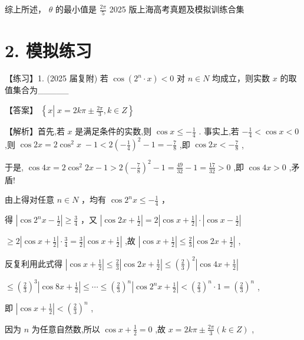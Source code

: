 \documentclass[10pt]{article}
\begin{document}
综上所述， \(\theta\) 的最小值是 \(\frac{2\pi }{5}\) 2025 版上海高考真题及模拟训练合集

\section*{2. 模拟练习}

【练习】1. (2025 届复附) 若 \(\cos \left( {{2}^{n} \cdot  x}\right)  < 0\) 对 \(n \in  N\) 均成立，则实数 \(x\) 的取值集合为\_\_\_\_\_

【答案】 \(\left\{  {x\left| {\;x = {2k\pi } \pm  \frac{2\pi }{3}}\right. ,k \in  Z}\right\}\)

【解析】首先,若 \(x\) 是满足条件的实数,则 \(\cos x \leq   - \frac{1}{4}\) . 事实上,若 \(- \frac{1}{4} < \cos x < 0\) ,则 \(\cos {2x} = 2{\cos }^{2}x \; - 1 < 2{\left( -\frac{1}{4}\right) }^{2} - 1 =  - \frac{7}{8}\) ,即 \(\cos {2x} <  - \frac{7}{8}\) ,

于是, \(\cos {4x} = 2{\cos }^{2}{2x} - 1 > 2{\left( -\frac{7}{8}\right) }^{2} - 1 = \frac{49}{32} - 1 = \frac{17}{32} > 0\) ,即 \(\cos {4x} > 0\) ,矛盾!

由上得对任意 \(n \in  N\) ，均有 \(\cos {2}^{n}x \leq   - \frac{1}{4}\) ，

得 \(\left| {\cos {2}^{n}x - \frac{1}{2}}\right|  \geq  \frac{3}{4}\) ，又 \(\left| {\cos {2x} + \frac{1}{2}}\right|  = 2\left| {\cos x + \frac{1}{2}}\right|  \cdot  \left| {\cos x - \frac{1}{2}}\right|\)

\(\geq  2\left| {\cos x + \frac{1}{2}}\right|  \cdot  \frac{3}{4} = \frac{3}{2}\left| {\cos x + \frac{1}{2}}\right|\) ,故 \(\left| {\cos x + \frac{1}{2}}\right|  \leq  \frac{2}{3}\left| {\cos {2x} + \frac{1}{2}}\right|\) ,

反复利用此式得 \(\left| {\cos x + \frac{1}{2}}\right|  \leq  \frac{2}{3}\left| {\cos {2x} + \frac{1}{2}}\right|  \leq  {\left( \frac{2}{3}\right) }^{2}\left| {\cos {4x} + \frac{1}{2}}\right|\)

\(\leq  {\left( \frac{2}{3}\right) }^{3}\left| {\cos {8x} + \frac{1}{2}}\right|  \leq  \cdots  \leq  {\left( \frac{2}{3}\right) }^{n}\left| {\cos {2}^{n}x + \frac{1}{2}}\right|  < {\left( \frac{2}{3}\right) }^{n} \cdot  1 = {\left( \frac{2}{3}\right) }^{n}\) ,

即 \(\left| {\cos x + \frac{1}{2}}\right|  < {\left( \frac{2}{3}\right) }^{n}\) ,

因为 \(n\) 为任意自然数,所以 \(\cos x + \frac{1}{2} = 0\) ,故 \(x = {2k\pi } \pm  \frac{2\pi }{3}\left( {k \in  Z}\right)\) ,
\end{document}
